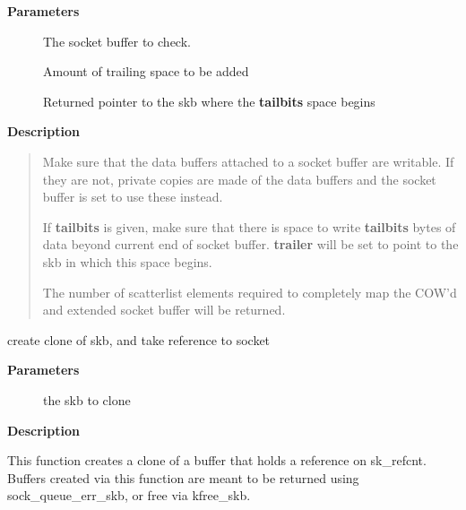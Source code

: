 \documentclass[a4paper,8pt,english]{sphinxmanual}
\begin{document}
\textbf{Parameters}
\begin{description}
\item[{}] \leavevmode
The socket buffer to check.

\item[{}] \leavevmode
Amount of trailing space to be added

\item[{}] \leavevmode
Returned pointer to the skb where the \textbf{tailbits} space begins

\end{description}

\textbf{Description}
\begin{quote}

Make sure that the data buffers attached to a socket buffer are
writable. If they are not, private copies are made of the data buffers
and the socket buffer is set to use these instead.

If \textbf{tailbits} is given, make sure that there is space to write \textbf{tailbits}
bytes of data beyond current end of socket buffer.  \textbf{trailer} will be
set to point to the skb in which this space begins.

The number of scatterlist elements required to completely map the
COW'd and extended socket buffer will be returned.
\end{quote}

\begin{fulllineitems}
\label{networking/kapi:c.skb_clone_sk}
create clone of skb, and take reference to socket

\end{fulllineitems}


\textbf{Parameters}
\begin{description}
\item[{}] \leavevmode
the skb to clone

\end{description}

\textbf{Description}

This function creates a clone of a buffer that holds a reference on
sk\_refcnt.  Buffers created via this function are meant to be
returned using sock\_queue\_err\_skb, or free via kfree\_skb.
\end{document}
